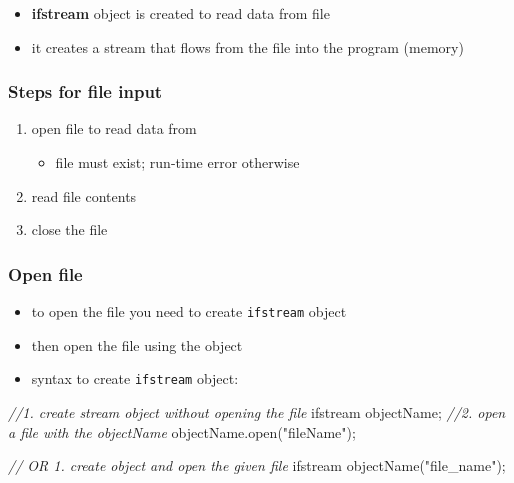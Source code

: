 \documentclass[11pt]{article}
\providecommand{\tightlist}{%
      \setlength{\itemsep}{0pt}\setlength{\parskip}{0pt}}
\newenvironment{Shaded}{}{}
\newcommand{\StringTok}[1]{\textcolor[rgb]{0.25,0.44,0.63}{{#1}}}
\newcommand{\CommentTok}[1]{\textcolor[rgb]{0.38,0.63,0.69}{\textit{{#1}}}}
\newcommand{\NormalTok}[1]{{#1}}
\newcommand{\OperatorTok}[1]{\textcolor[rgb]{0.40,0.40,0.40}{{#1}}}
\begin{document}
\begin{itemize}
\tightlist
\item
  \textbf{ifstream} object is created to read data from file
\item
  it creates a stream that flows from the file into the program (memory)
\end{itemize}

\hypertarget{steps-for-file-input}{%
\subsubsection{Steps for file input}\label{steps-for-file-input}}

\begin{enumerate}
\def\labelenumi{\arabic{enumi}.}
\tightlist
\item
  open file to read data from

  \begin{itemize}
  \tightlist
  \item
    file must exist; run-time error otherwise
  \end{itemize}
\item
  read file contents
\item
  close the file
\end{enumerate}

\hypertarget{open-file}{%
\subsubsection{Open file}\label{open-file}}

\begin{itemize}
\tightlist
\item
  to open the file you need to create \texttt{ifstream} object
\item
  then open the file using the object
\item
  syntax to create \texttt{ifstream} object:
\end{itemize}

\begin{Shaded}
\begin{Highlighting}[]
\CommentTok{//1. create stream object without opening the file}
\NormalTok{ifstream objectName}\OperatorTok{;}
\CommentTok{//2. open a file with the objectName}
\NormalTok{objectName}\OperatorTok{.}\NormalTok{open}\OperatorTok{(}\StringTok{"fileName"}\OperatorTok{);}

\CommentTok{// OR 1. create object and open the given file}
\NormalTok{ifstream objectName}\OperatorTok{(}\StringTok{"file\_name"}\OperatorTok{);}
\end{Highlighting}
\end{Shaded}
\end{document}
